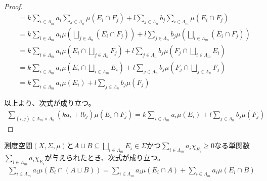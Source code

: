 \documentclass[dvipdfmx]{jsarticle}
\begin{document}
\begin{proof}
\begin{align*}
&= k\sum_{i \in \varLambda_{m}} {a_{i}\sum_{j \in \varLambda_{n}} {\mu\left( E_{i} \cap F_{j} \right)}} + l\sum_{j \in \varLambda_{n}} {b_{j}\sum_{i \in \varLambda_{m}} {\mu\left( E_{i} \cap F_{j} \right)}}\\
&= k\sum_{i \in \varLambda_{m}} {a_{i}\mu\left( \bigsqcup_{j \in \varLambda_{n}} \left( E_{i} \cap F_{j} \right) \right)} + l\sum_{j \in \varLambda_{n}} {b_{j}\mu\left( \bigsqcup_{i \in \varLambda_{m}} \left( E_{i} \cap F_{j} \right) \right)}\\
&= k\sum_{i \in \varLambda_{m}} {a_{i}\mu\left( E_{i} \cap \bigsqcup_{j \in \varLambda_{n}} F_{j} \right)} + l\sum_{j \in \varLambda_{n}} {b_{j}\mu\left( F_{j} \cap \bigsqcup_{i \in \varLambda_{m}} E_{i} \right)}\\
&= k\sum_{i \in \varLambda_{m}} {a_{i}\mu\left( E_{i} \cap \bigsqcup_{i \in \varLambda_{m}} E_{i} \right)} + l\sum_{j \in \varLambda_{n}} {b_{j}\mu\left( F_{j} \cap \bigsqcup_{j \in \varLambda_{n}} F_{j} \right)}\\
&= k\sum_{i \in \varLambda_{m}} {a_{i}\mu\left( E_{i} \right)} + l\sum_{j \in \varLambda_{n}} {b_{j}\mu\left( F_{j} \right)}
\end{align*}\par
以上より、次式が成り立つ。
\begin{align*}
\sum_{(i,j) \in \varLambda_{m} \times \varLambda_{n}} {\left( ka_{i} + lb_{j} \right)\mu\left( E_{i} \cap F_{j} \right)} = k\sum_{i \in \varLambda_{m}} {a_{i}\mu\left( E_{i} \right)} + l\sum_{j \in \varLambda_{n}} {b_{j}\mu\left( F_{j} \right)}
\end{align*}
\end{proof}
\begin{thm}\label{4.6.1.3}
測度空間$(X,\varSigma,\mu)$と$A \sqcup B \subseteq \bigsqcup_{i \in \varLambda_{m}} E_{i} \in \varSigma$かつ$\sum_{i \in \varLambda_{m}} {a_{i}\chi_{E_{i}}} \geq 0$なる単関数$\sum_{i \in \varLambda_{m}} {a_{i}\chi_{E_{i}}}$が与えられたとき、次式が成り立つ。
\begin{align*}
\sum_{i \in \varLambda_{m}} {a_{i}\mu\left( E_{i} \cap (A \sqcup B) \right)} = \sum_{i \in \varLambda_{m}} {a_{i}\mu\left( E_{i} \cap A \right)} + \sum_{i \in \varLambda_{m}} {a_{i}\mu\left( E_{i} \cap B \right)}
\end{align*}
\end{thm}
\end{document}
